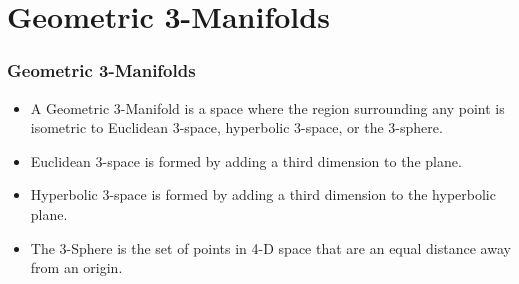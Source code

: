 \documentclass[13pt]{beamer}
\begin{document}
\section{Geometric 3-Manifolds} %
\begin{frame}
\frametitle{Geometric 3-Manifolds}
  \begin{itemize}
    \item A \alert{Geometric 3-Manifold} is a space where the region surrounding any point is isometric to Euclidean 3-space, hyperbolic 3-space, or the 3-sphere.
    \item \alert{Euclidean 3-space} is formed by adding a third dimension to the plane.
    \item \alert{Hyperbolic 3-space} is formed by adding a third dimension to the hyperbolic plane.
    \item \alert{The 3-Sphere} is the set of points in 4-D space that are an equal distance away from an origin.
  \end{itemize}
\end{frame}
\end{document}
